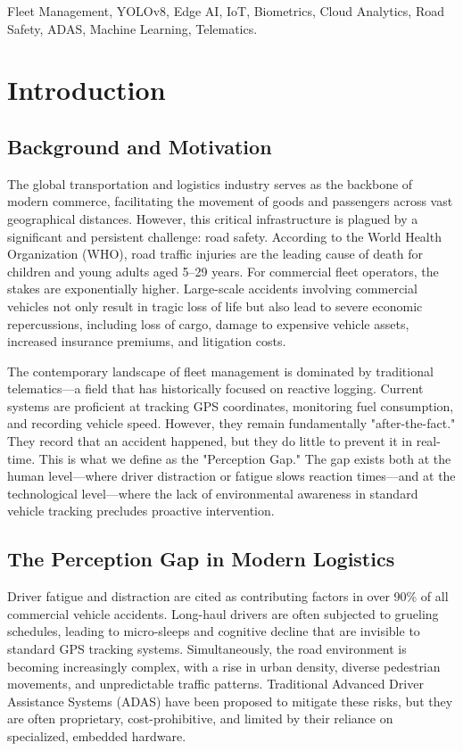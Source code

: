 \documentclass[conference]{IEEEtran}
\begin{document}
\begin{IEEEkeywords}
Fleet Management, YOLOv8, Edge AI, IoT, Biometrics, Cloud Analytics, Road Safety, ADAS, Machine Learning, Telematics.
\end{IEEEkeywords}

\section{Introduction}

\subsection{Background and Motivation}
The global transportation and logistics industry serves as the backbone of modern commerce, facilitating the movement of goods and passengers across vast geographical distances. However, this critical infrastructure is plagued by a significant and persistent challenge: road safety. According to the World Health Organization (WHO), road traffic injuries are the leading cause of death for children and young adults aged 5–29 years. For commercial fleet operators, the stakes are exponentially higher. Large-scale accidents involving commercial vehicles not only result in tragic loss of life but also lead to severe economic repercussions, including loss of cargo, damage to expensive vehicle assets, increased insurance premiums, and litigation costs.

The contemporary landscape of fleet management is dominated by traditional telematics—a field that has historically focused on reactive logging. Current systems are proficient at tracking GPS coordinates, monitoring fuel consumption, and recording vehicle speed. However, they remain fundamentally "after-the-fact." They record that an accident happened, but they do little to prevent it in real-time. This is what we define as the "Perception Gap." The gap exists both at the human level—where driver distraction or fatigue slows reaction times—and at the technological level—where the lack of environmental awareness in standard vehicle tracking precludes proactive intervention.

\subsection{The Perception Gap in Modern Logistics}
Driver fatigue and distraction are cited as contributing factors in over 90\% of all commercial vehicle accidents. Long-haul drivers are often subjected to grueling schedules, leading to micro-sleeps and cognitive decline that are invisible to standard GPS tracking systems. Simultaneously, the road environment is becoming increasingly complex, with a rise in urban density, diverse pedestrian movements, and unpredictable traffic patterns. Traditional Advanced Driver Assistance Systems (ADAS) have been proposed to mitigate these risks, but they are often proprietary, cost-prohibitive, and limited by their reliance on specialized, embedded hardware.
\end{document}

